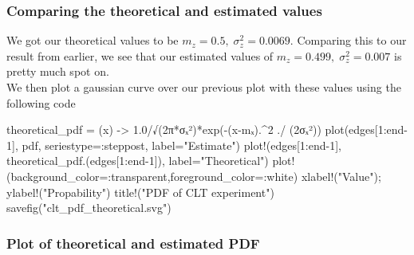 \documentclass[compress]{beamer}
\begin{document}
\begin{frame}[fragile]
    \frametitle{Comparing the theoretical and estimated values}
    We got our theoretical values to be $m_z=0.5,\; \sigma_z^2=0.0069$.
    Comparing this to our result from earlier, we see that our estimated
    values of $m_z=0.499,\; \sigma_z^2=0.007$ is pretty much spot on. \\
    \medskip
    We then plot a gaussian curve over our previous plot with these values
    using the following code
    \begin{jllisting}[gobble=8]
        theoretical_pdf = (x) -> 1.0/√(2π*σₓ²)*exp(-(x-mₓ).^2 ./ (2σₓ²))
        plot(edges[1:end-1], pdf, seriestype=:steppost, label="Estimate")
        plot!(edges[1:end-1], theoretical_pdf.(edges[1:end-1]), label="Theoretical")
        plot!(background_color=:transparent,foreground_color=:white)
        xlabel!("Value"); ylabel!("Propability")
        title!("PDF of CLT experiment")
        savefig("clt_pdf_theoretical.svg")
    \end{jllisting}
\end{frame}

\begin{frame}
    \frametitle{Plot of theoretical and estimated PDF}
    \begin{figure}
        
    \end{figure}
\end{frame}
\end{document}
